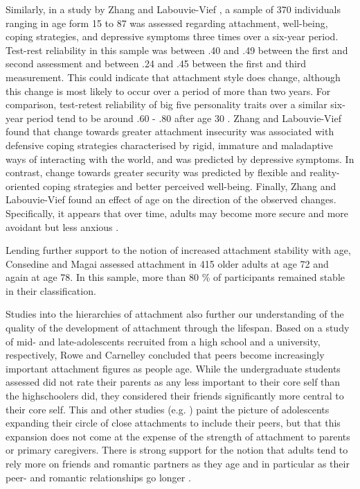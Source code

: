 \documentclass[12pt]{report}
\begin{document}
Similarly, in a study by Zhang and Labouvie-Vief \citeyear{Zhang2004}, a sample of 370 individuals ranging in age form 15 to 87 was assessed regarding attachment, well-being, coping strategies, and depressive symptoms three times over a six-year period.
Test-rest reliability in this sample was between .40 and .49 between the first and second assessment and between .24 and .45 between the first and third measurement. This could indicate that attachment style does change, although this change is most likely to occur over a period of more than two years.
For comparison, test-retest reliability of big five personality traits over a similar six-year period tend to be around .60 - .80 after age 30 \cite{Costa1988,Roberts2000}.
Zhang and Labouvie-Vief \citeyear{Zhang2004} found that change towards greater attachment insecurity was associated with defensive coping strategies characterised by rigid, immature and maladaptive ways of interacting with the world, and was predicted by depressive symptoms.
In contrast, change towards greater security was predicted by flexible and reality-oriented coping strategies and better perceived well-being.
Finally, Zhang and Labouvie-Vief found an effect of age on the direction of the observed changes.
Specifically, it appears that over time, adults may become more secure and more avoidant but less anxious  \cite{Zhang2004}.

Lending further support to the notion of increased attachment stability with age, Consedine and Magai \cite{Magai2016} assessed attachment in 415 older adults at age 72 and again at age 78.
In this sample, more than 80 \% of participants remained stable in their classification.

Studies into the hierarchies of attachment also further our understanding of the quality of the development of attachment through the lifespan.
Based on a study of mid- and late-adolescents recruited from a high school and a university, respectively, Rowe and Carnelley \citeyear{Rowe2005} concluded that peers become increasingly important attachment figures as people age. While the undergraduate students assessed did not rate their parents as any less important to their core self than the highschoolers did, they considered their friends significantly more central to their core self.
This and other studies (e.g. ) paint the picture of adolescents expanding their circle of close attachments to include their peers, but that this expansion does not come at the expense of the strength of attachment to parents or primary caregivers.
There is strong support for the notion that adults tend to rely more on friends and romantic partners as they age and in particular as their peer- and romantic relationships go longer \cite{Tancredy2006,Doherty2004,Fraley1997}.
\end{document}
